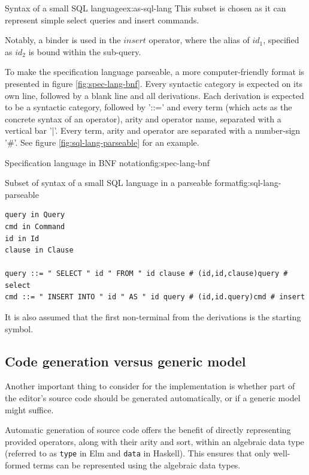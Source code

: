 \begin{example}{Syntax of a small SQL language}{ex:as-sql-lang}
  This subset is chosen as it can represent simple select queries and insert commands.

  Notably, a binder is used in the $insert$ operator, where the alias of $id_1$, specified as $id_2$ is bound within the sub-query.
\end{example}

To make the specification language parseable, a more computer-friendly format is presented in figure \cref{fig:spec-lang-bnf}. Every syntactic category is expected on its own line, followed by a blank line and all derivations. Each derivation is expected to be a syntactic category, followed by '::=' and every term (which acts as the concrete syntax of an operator), arity and operator name, separated with a vertical bar '|'. Every term, arity and operator are separated with a number-sign '\#'. See figure \cref{fig:sql-lang-parseable} for an example.

\begin{myfigure}{Specification language in BNF notation}{fig:spec-lang-bnf}

\end{myfigure}

\begin{myfigure}{Subset of syntax of a small SQL language in a parseable format}{fig:sql-lang-parseable}
  \begin{lstlisting}[backgroundcolor=\color{myfigurecolorback}]
query in Query
cmd in Command
id in Id
clause in Clause

query ::= " SELECT " id " FROM " id clause # (id,id,clause)query # select
cmd ::= " INSERT INTO " id " AS " id query # (id,id.query)cmd # insert
\end{lstlisting}

  It is also assumed that the first non-terminal from the derivations is the starting symbol.

\end{myfigure}

\subsection{Code generation versus generic model}

Another important thing to consider for the implementation is whether
part of the editor's source code should be generated automatically,
or if a generic model might suffice.

Automatic generation of source code offers the benefit of directly representing
provided operators, along with their arity and sort, within an algebraic data
type (referred to as \texttt{type} in Elm and \texttt{data} in Haskell).
This ensures that only well-formed terms can be represented using the algebraic
data types.

